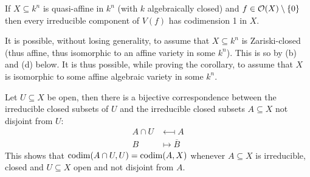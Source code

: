 \documentclass[a4paper,parskip=full,numbers=enddot]{scrreprt}
\begin{document}
\begin{cor}
    If $X\subseteq k^n$ is quasi-affine in $k^n$ (with $k$ algebraically closed) and $f\in\mathcal{O}(X)\setminus\{0\}$ then every irreducible component of $V(f)$ has codimension 1 in $X$.
\end{cor}
\begin{rem*}
    \begin{alphanumerate}
    \item 
        It is possible, without losing generality, to assume that $X\subseteq k^n$ is Zariski-closed (thus affine, thus isomorphic to an affine variety in some $k^n$). This is so by (b) and (d) below. It is thus possible, while proving the corollary, to assume that $X$ is isomorphic to some affine algebraic variety in some $k^n$.
    \item
        Let $U\subseteq X$ be open, then there is a bijective correspondence between the irreducible closed subsets of $U$ and the irreducible closed subsets $A\subseteq X$ not disjoint from $U$:
        \begin{align*}
            A\cap U &\longmapsfrom A\\
            B&\longmapsto \overline{B}
        \end{align*}
        This shows that $\operatorname{codim} (A\cap U, U)  = \operatorname{codim}(A,X)$ whenever $A\subseteq X$ is irreducible, closed and $U\subseteq X$ open and not disjoint from $A$.
    \end{alphanumerate}
\end{rem*}
\printbibliography
\end{document}
